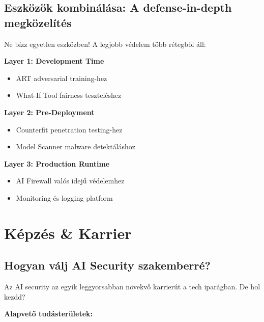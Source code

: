 \documentclass{../templates/magazine}
\begin{document}
\subsection{Eszközök kombinálása: A defense-in-depth megközelítés}

Ne bízz egyetlen eszközben! A legjobb védelem több rétegből áll:

\textbf{Layer 1: Development Time}
\begin{itemize}
    \item ART adversarial training-hez
    \item What-If Tool fairness teszteléshez
\end{itemize}

\textbf{Layer 2: Pre-Deployment}
\begin{itemize}
    \item Counterfit penetration testing-hez
    \item Model Scanner malware detektáláshoz
\end{itemize}

\textbf{Layer 3: Production Runtime}
\begin{itemize}
    \item AI Firewall valós idejű védelemhez
    \item Monitoring és logging platform
\end{itemize}

\newpage

\section{Képzés \& Karrier}

\subsection{Hogyan válj AI Security szakemberré?}

Az AI security az egyik leggyorsabban növekvő karrierút a tech iparágban. De hol kezdd?

\textbf{Alapvető tudásterületek:}
\end{document}

